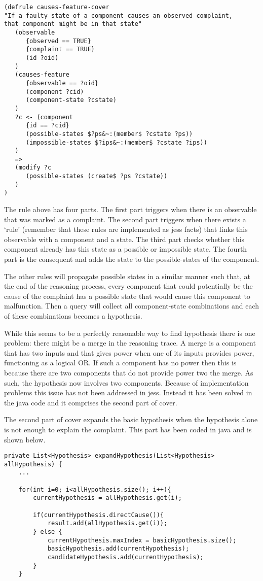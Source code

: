 \documentclass[a4paper,10pt]{article}
\begin{document}
\begin{verbatim}
(defrule causes-feature-cover
"If a faulty state of a component causes an observed complaint, 
that component might be in that state"
   (observable
      {observed == TRUE}
      {complaint == TRUE}
      (id ?oid)
   )
   (causes-feature
      {observable == ?oid}
      (component ?cid)
      (component-state ?cstate)
   )
   ?c <- (component
      {id == ?cid}
      (possible-states $?ps&~:(member$ ?cstate ?ps))
      (impossible-states $?ips&~:(member$ ?cstate ?ips))
   )
   =>
   (modify ?c
      (possible-states (create$ ?ps ?cstate))
   )
)
\end{verbatim}

The rule above has four parts. The first part triggers when there is an observable that was marked as a complaint. The second part triggers when there exists a `rule' (remember that these rules are implemented as jess facts) that links this observable with a component and a state. The third part checks whether this component already has this state as a possible or impossible state. The fourth part is the consequent and adds the state to the possible-states of the component.

The other rules will propagate possible states in a similar manner such that, at the end of the reasoning process, every component that could potentially be the cause of the complaint has a possible state that would cause this component to malfunction. Then a query will collect all component-state combinations and each of these combinations becomes a hypothesis.

While this seems to be a perfectly reasonable way to find hypothesis there is one problem: there might be a merge in the reasoning trace. A merge is a component that has two inputs and that gives power when one of its inputs provides power, functioning as a logical OR. If such a component has no power then this is because there are two components that do not provide power two the merge. As such, the hypothesis now involves two components. Because of implementation problems this issue has not been addressed in jess. Instead it has been solved in the java code and it comprises the second part of cover.



The second part of cover expands the basic hypothesis when the hypothesis alone is not enough to explain the complaint. This part has been coded in java and is shown below.

\begin{verbatim}
private List<Hypothesis> expandHypothesis(List<Hypothesis> allHypothesis) {
    ...

    for(int i=0; i<allHypothesis.size(); i++){
        currentHypothesis = allHypothesis.get(i);

        if(currentHypothesis.directCause()){
            result.add(allHypothesis.get(i));
        } else {
            currentHypothesis.maxIndex = basicHypothesis.size();
            basicHypothesis.add(currentHypothesis);
            candidateHypothesis.add(currentHypothesis); 
        }
    }
\end{verbatim}
\end{document}

